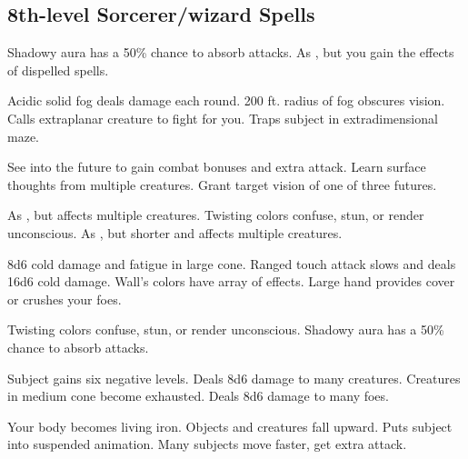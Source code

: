 \subsection{8th-level Sorcerer/wizard Spells} 
\begin{swspelllist}
     Shadowy aura has a 50\% chance to absorb attacks. 
   As , but you gain the effects of dispelled spells.

   Acidic solid fog deals damage each round.
   200 ft. radius of fog obscures vision.
   Calls extraplanar creature to fight for you.
   Traps subject in extradimensional maze.

   See into the future to gain combat bonuses and extra attack.
   Learn surface thoughts from multiple creatures.
   Grant target vision of one of three futures.

   As , but affects multiple creatures.
   Twisting colors confuse, stun, or render unconscious.
   As , but shorter and affects multiple creatures.

   8d6 cold damage and fatigue in large cone.
   Ranged touch attack slows and deals 16d6 cold damage.
   Wall's colors have array of effects.
   Large hand provides cover or crushes your foes.

   Twisting colors confuse, stun, or render unconscious.
     Shadowy aura has a 50\% chance to absorb attacks. 
  \spellheadrestricted{}

   Subject gains six negative levels.
   Deals 8d6 damage to many creatures.
   Creatures in medium cone become exhausted.
   Deals 8d6 damage to many foes.

   Your body becomes living iron.
   Objects and creatures fall upward.
  \M Puts subject into suspended animation.
   Many subjects move faster, get extra attack.
\end{swspelllist}

